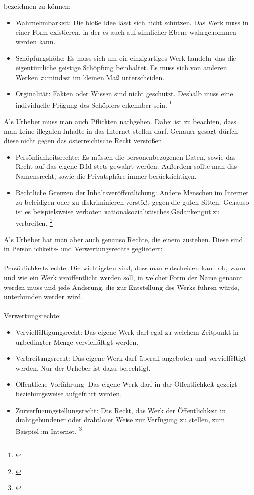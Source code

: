 \documentclass[titlepage,12pt,twoside]{article}
\begin{document}
bezeichnen zu können: \\
\begin{itemize}
	\item Wahrnehmbarkeit: Die bloße Idee lässt sich nicht schützen. Das Werk muss in einer Form existieren, 
	in der es auch auf sinnlicher Ebene wahrgenommen werden kann.
	\item Schöpfungshöhe: Es muss sich um ein einzigartiges Werk handeln, das die eigentümliche geistige 
	Schöpfung beinhaltet. Es muss sich von anderen Werken zumindest im kleinen Maß unterscheiden.
	\item Orginalität: Fakten oder Wissen sind nicht geschützt. Deshalb muss eine individuelle Prägung 
	des Schöpfers erkennbar sein. \footnote{\cite{Saferinternet.p8}} \\
\end{itemize}
\hfill \break
Als Urheber muss man auch Pflichten nachgehen. Dabei ist zu beachten, dass man keine illegalen Inhalte in das 
Internet stellen darf. Genauer gesagt dürfen diese nicht gegen das österreichische Recht verstoßen. \\
\begin{itemize}
	\item Persönlichkeitsrechte: Es müssen die personenbezogenen Daten, sowie das Recht auf das eigene Bild 
	stets gewahrt werden. Außerdem sollte man das Namensrecht, sowie die Privatsphäre immer berücksichtigen.
	\item Rechtliche Grenzen der Inhaltsveröffentlichung: Andere Menschen im Internet zu beleidigen oder zu 
	diskriminieren verstößt gegen die guten Sitten. Genauso ist es beispielsweise verboten 
	nationalsozialistisches Gedankengut zu verbreiten. \footnote{\cite{Saferinternet.p10}}
\end{itemize}
\hfill \break
Als Urheber hat man aber auch genauso Rechte, die einem zustehen. Diese sind in Persönlichkeits- und 
Verwertungsrechte gegliedert: \\
\\
Persönlichkeitsrechte: Die wichtigsten sind, dass man entscheiden kann ob, wann und wie ein Werk 
veröffentlicht werden soll, in welcher Form der Name genannt werden muss und jede Änderung, die zur 
Entstellung des Werks führen würde, unterbunden werden wird. \\
\\
Verwertungsrechte: \\ 
\begin{itemize}
	\item Vervielfältigungsrecht: Das eigene Werk darf egal zu welchem Zeitpunkt in unbedingter Menge 
	vervielfältigt werden.
	\item Verbreitungsrecht: Das eigene Werk darf überall angeboten und vervielfältigt werden. Nur der 
	Urheber ist dazu berechtigt.
	\item Öffentliche Vorführung: Das eigene Werk darf in der Öffentlichkeit gezeigt beziehungsweise 
	aufgeführt werden. 
	\item Zurverfügungstellungsrecht: Das Recht, das Werk der Öffentlichkeit in drahtgebundener oder 
	drahtloser Weise zur Verfügung zu stellen, zum Beispiel im Internet. \footnote{\cite{Saferinternet.p11}}
\end{itemize}
\end{document}
